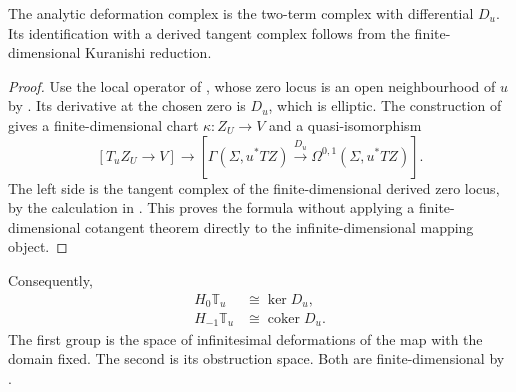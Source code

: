 The analytic deformation complex is the two-term complex with differential
$D_u$. Its identification with a derived tangent complex follows from the
finite-dimensional Kuranishi reduction.


\begin{proof}
  Use the local operator of
  , whose zero locus is an
  open neighbourhood of $u$ by
  .
  Its derivative at the chosen zero is $D_u$, which is elliptic.
  The construction of  gives a finite-dimensional chart
  $\kappa\colon Z_U\to V$ and a quasi-isomorphism
  \[
    [T_uZ_U\longrightarrow V]\longrightarrow
    [\Gamma(\Sigma,u^*TZ)\xrightarrow{D_u}
      \Omega^{0,1}(\Sigma,u^*TZ)].
  \]
  The left side is the tangent complex of the finite-dimensional derived
  zero locus, by the calculation in . This proves the formula
  without applying a finite-dimensional cotangent theorem directly to
  the infinite-dimensional mapping object.
\end{proof}

Consequently,
\begin{align*}
  H_0\mathbb T_u
  &\cong\ker D_u,\\
  H_{-1}\mathbb T_u
  &\cong\operatorname{coker}D_u.
\end{align*}
The first group is the space of infinitesimal deformations of the map with the
domain fixed. The second is its obstruction space. Both are finite-dimensional
by .


